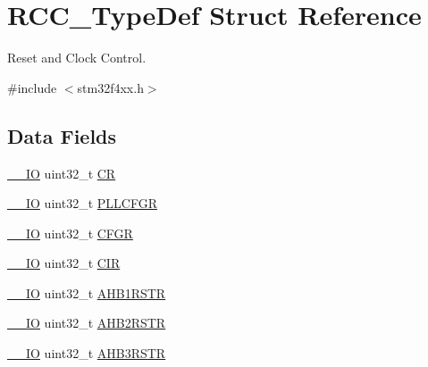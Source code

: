 \hypertarget{struct_r_c_c___type_def}{\section{R\-C\-C\-\_\-\-Type\-Def Struct Reference}
\label{struct_r_c_c___type_def}
}


Reset and Clock Control.  




{\ttfamily \#include $<$stm32f4xx.\-h$>$}

\subsection*{Data Fields}
\begin{DoxyCompactItemize}
\item 
\hyperlink{group___c_m_s_i_s__core__definitions_gaec43007d9998a0a0e01faede4133d6be}{\-\_\-\-\_\-\-I\-O} uint32\-\_\-t \hyperlink{struct_r_c_c___type_def_ab40c89c59391aaa9d9a8ec011dd0907a}{C\-R}
\item 
\hyperlink{group___c_m_s_i_s__core__definitions_gaec43007d9998a0a0e01faede4133d6be}{\-\_\-\-\_\-\-I\-O} uint32\-\_\-t \hyperlink{struct_r_c_c___type_def_ae6ff257862eba6b4b367feea786bf1fd}{P\-L\-L\-C\-F\-G\-R}
\item 
\hyperlink{group___c_m_s_i_s__core__definitions_gaec43007d9998a0a0e01faede4133d6be}{\-\_\-\-\_\-\-I\-O} uint32\-\_\-t \hyperlink{struct_r_c_c___type_def_a26f1e746ccbf9c9f67e7c60e61085ec1}{C\-F\-G\-R}
\item 
\hyperlink{group___c_m_s_i_s__core__definitions_gaec43007d9998a0a0e01faede4133d6be}{\-\_\-\-\_\-\-I\-O} uint32\-\_\-t \hyperlink{struct_r_c_c___type_def_a907d8154c80b7e385478943f90b17a3b}{C\-I\-R}
\item 
\hyperlink{group___c_m_s_i_s__core__definitions_gaec43007d9998a0a0e01faede4133d6be}{\-\_\-\-\_\-\-I\-O} uint32\-\_\-t \hyperlink{struct_r_c_c___type_def_a46c20c598e9e12f919f0ea47ebcbc90f}{A\-H\-B1\-R\-S\-T\-R}
\item 
\hyperlink{group___c_m_s_i_s__core__definitions_gaec43007d9998a0a0e01faede4133d6be}{\-\_\-\-\_\-\-I\-O} uint32\-\_\-t \hyperlink{struct_r_c_c___type_def_a78a5aa9dd5694c48a7d8e66888a46450}{A\-H\-B2\-R\-S\-T\-R}
\item 
\hyperlink{group___c_m_s_i_s__core__definitions_gaec43007d9998a0a0e01faede4133d6be}{\-\_\-\-\_\-\-I\-O} uint32\-\_\-t \hyperlink{struct_r_c_c___type_def_a28560c5bfeb45326ea7f2019dba57bea}{A\-H\-B3\-R\-S\-T\-R}
\item 

\end{DoxyCompactItemize}
